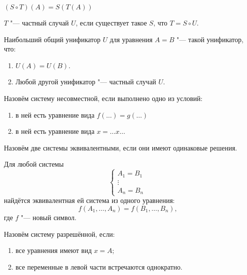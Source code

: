 \begin{definition}[композиция]
    $(S \circ T)(A) = S(T(A))$
\end{definition}

\begin{definition}
    $T$ "--- частный случай $U$, если существует такое $S$, что $T = S \circ U$.
\end{definition}

\begin{definition}
    Наибольший общий унификатор $U$ для уравнения $A=B$ "--- такой унификатор, что:
    \begin{enumerate}
        \item $U(A)=U(B)$.
        \item Любой другой унификатор "--- частный случай $U$.
    \end{enumerate}
\end{definition}

\begin{definition}
    Назовём систему несовместной, если выполнено одно из условий:
    \begin{enumerate}
        \item в ней есть уравнение вида $f(\ldots)=g(\ldots)$
        \item в ней есть уравнение вида $x = \ldots x \ldots$
    \end{enumerate}
\end{definition}

\begin{definition}
    Назовём две системы эквивалентными, если они имеют одинаковые решения.
\end{definition}

\begin{statement}
    Для любой системы
    \[
        \begin{cases} A_1 = B_1 \\ \vdots \\ A_n = B_n \end{cases}
    \]
    найдётся эквивалентная ей система из одного уравнения:
    \[
        f(A_1, \ldots, A_n) = f(B_1, \ldots, B_n)\text{,}
    \]
    где $f$ "--- новый символ.
\end{statement}

\begin{definition}
    Назовём систему разрешённой, если:
    \begin{enumerate}
        \item все уравнения имеют вид $x = A$;
        \item все переменные в левой части встречаются однократно.
    \end{enumerate}
\end{definition}

